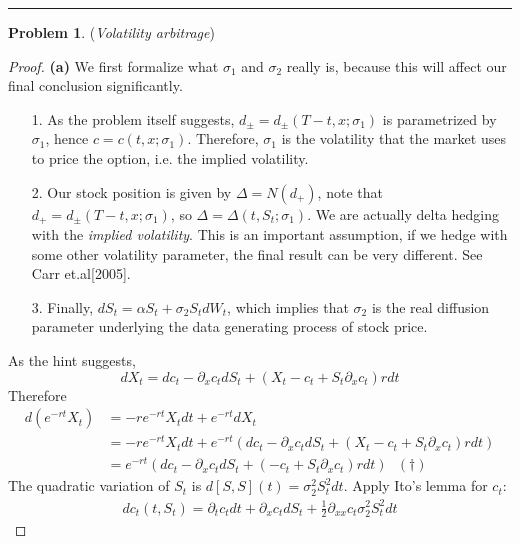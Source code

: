 \documentclass[a4paper, 10pt]{article}
\theoremstyle{definition}
\newtheorem{problem}{Problem}
\theoremstyle{hSol}
\begin{document}
\noindent\rule{16cm}{0.4pt}
\begin{problem} (\textit{Volatility arbitrage})
\end{problem}
\begin{proof} \textbf{(a)} We first formalize what $\sigma_1$ and $\sigma_2$ really is, because this will affect our final conclusion significantly.
\begin{itemize}
	\item[1.] As the problem itself suggests, $d_{\pm} = d_{\pm}(T-t, x; \sigma_1)$ is parametrized by $\sigma_1$, hence $c = c(t,x;\sigma_1)$. Therefore, $\sigma_1$ is the volatility that the market uses to price the option, i.e. the implied volatility.
	\item[2.] Our stock position is given by $\Delta = N(d_+)$, note that $d_+ = d_{\pm}(T-t, x; \sigma_1)$, so $\Delta = \Delta(t, S_t; \sigma_1)$. We are actually delta hedging with the \emph{implied volatility}. This is an important assumption, if we hedge with some other volatility parameter, the final result can be very different. See Carr et.al[2005]. 
	\item[3.] Finally, $dS_t = \alpha S_t + \sigma_2 S_t dW_t$, which implies that $\sigma_2$ is the real diffusion parameter underlying the data generating process of stock price.
\end{itemize}
As the hint suggests,
\begin{equation}
	dX_t = dc_t - \partial_x c_t dS_t + (X_t - c_t + S_t \partial_xc_t)rdt
\end{equation}
Therefore
\begin{equation}
	\begin{split}
		d(e^{-rt}X_t) &= -r e^{-rt}X_tdt + e^{-rt}dX_t \\
		&= -r e^{-rt}X_tdt + e^{-rt}\left(dc_t - \partial_x c_t dS_t + (X_t - c_t + S_t \partial_xc_t)rdt\right) \\
		&= e^{-rt}\left(dc_t - \partial_x c_t dS_t + (- c_t + S_t \partial_xc_t)rdt\right) ~~~(\dag)
	\end{split}
\end{equation}
The quadratic variation of $S_t$ is $d[S,S](t) = \sigma_2^2 S_t^2 dt$. Apply Ito's lemma for $c_t$:
\begin{equation}
	\begin{split}
		dc_t(t,S_t) = \partial_t c_t dt + \partial_x c_t dS_t + \frac{1}{2}\partial_{xx}c_t \sigma_2^2 S_t^2 dt
	\end{split}
\end{equation}

\end{proof}
\end{document}
